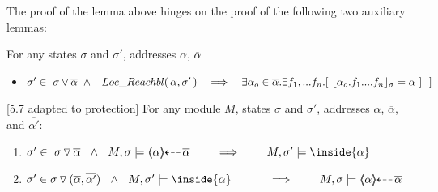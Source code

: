 The proof of the lemma above hinges on the proof of the following two auxiliary lemmas:

\begin{lemma} 
\label{lemma:lrelavant:push}
For any  states  $\sigma$ and $\sigma'$, addresses $\alpha$, $\overline \alpha$
\begin{itemize}
\item
$\sigma' \in \PushS {\alpha} {\sigma} \ \wedge\ \  \LRelevant \alpha {\sigma'} \ \ \ \Longrightarrow  \ \ \ \exists \alpha_o\in \overline \alpha.\exists f_1,...f_n.[\ {\interpret {\sigma} {\alpha_o.f_1....f_{n}}}=\alpha\ ]\ \ ]$
\end{itemize}
\end{lemma}



\begin{lemma} 
\label{lemma:push:ass:state:P}[5.7 adapted to protection]
For any module  $M$, states  $\sigma$ and $\sigma'$, addresses $\alpha$, $\overline \alpha$, and $\overline {\alpha'}$:
\\
\begin{enumerate}
 \item
 \label{lemma:push:ass:state:one:P}
$\sigma' \in \PushS {\alpha} {\sigma}\ \ \wedge\ \ M,  \sigma \models \protectedFrom {\alpha} {\overline {\alpha}}
\ \ \ \  \ \ \     \Longrightarrow \ \ \ \  \ \ \   M, \sigma' \models \inside  {\alpha} $
\item
\label{lemma:push:ass:state:two:P}
$\sigma' \in \PushSLong{(\overline \alpha, \overline {\alpha'})} {\sigma}\ \ \wedge\ \ M,  \sigma' \models \inside {\alpha} \ \ \ 
\ \ \ \  \ \ \    \Longrightarrow  \ \ \ \  \ \ \   M, \sigma \models \protectedFrom {\alpha} {\overline {\alpha}} $
\end{enumerate}
\end{lemma}

